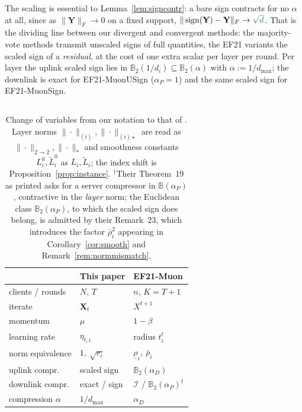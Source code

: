 
The scaling is essential to Lemma~\ref{lem:signcontr}: a bare sign contracts for no $\alpha$ at all, since as $\|\mathbf{Y}\|_F \to 0$ on a fixed support, $\|\operatorname{sign}(\mathbf{Y})-\mathbf{Y}\|_F \to \cx{\sqrt d}$. That is the dividing line between our divergent and convergent methods: the majority-vote methods transmit unscaled signs of full quantities, the EF21 variants the scaled sign of a \emph{residual}, at the cost of one extra scalar per layer per round. Per layer the uplink scaled sign lies in $\mathbb{B}_2(1/d_i) \subseteq \mathbb{B}_2(\alpha)$ with $\alpha := 1/d_{\max}$; the downlink is exact for EF21-MuonUSign ($\alpha_P = 1$) and the same scaled sign for EF21-MuonSign.

\subsection{}


\begin{table}[!t]
\centering\footnotesize
\setlength{\tabcolsep}{4pt}
\begin{tabular}{@{}lll@{}}
\toprule
 & \textbf{This paper} & \textbf{EF21-Muon} \\
\midrule
clients / rounds & $N$, $T$ & $n$, $K = T+1$ \\
iterate & $\mathbf{X}_t$ & $X^{t+1}$ \\
momentum & $\mu$ & $1 - \beta$ \\
learning rate & $\eta_{t,i}$ & radius $t_i^{t}$ \\
norm equivalence & $1,\ \sqrt{r_i}$ & $\underline{\rho}_i,\ \bar{\rho}_i$ \\
uplink compr. & scaled sign & $\mathbb{B}_2(\alpha_D)$ \\
downlink compr. & exact / sign & $\mathcal{I}$ / $\mathbb{B}_2(\alpha_P)^{\dagger}$ \\
compression $\alpha$ & $1/d_{\max}$ & $\alpha_D$ \\
\bottomrule
\end{tabular}
\caption{Change of variables from our notation to that of \citet{gruntkowska2025error}. Layer norms $\|\cdot\|_{(i)},\|\cdot\|_{(i)\star}$ are read as $\|\cdot\|_{2\to2},\|\cdot\|_{*}$ and smoothness constants $L_i^0,\tilde{L}_i^0$ as $L_i,\tilde{L}_i$; the index shift is Proposition~\ref{prop:instance}. $^{\dagger}$Their Theorem~19 as printed asks for a server compressor in $\mathbb{B}(\alpha_P)$, contractive in the \emph{layer} norm; the Euclidean class $\mathbb{B}_2(\alpha_P)$, to which the scaled sign does belong, is admitted by their Remark~23, which introduces the factor $\bar\rho_i^2$ appearing in Corollary~\ref{cor:smooth} and Remark~\ref{rem:normmismatch}.}
\label{tab:dict}
\end{table}

